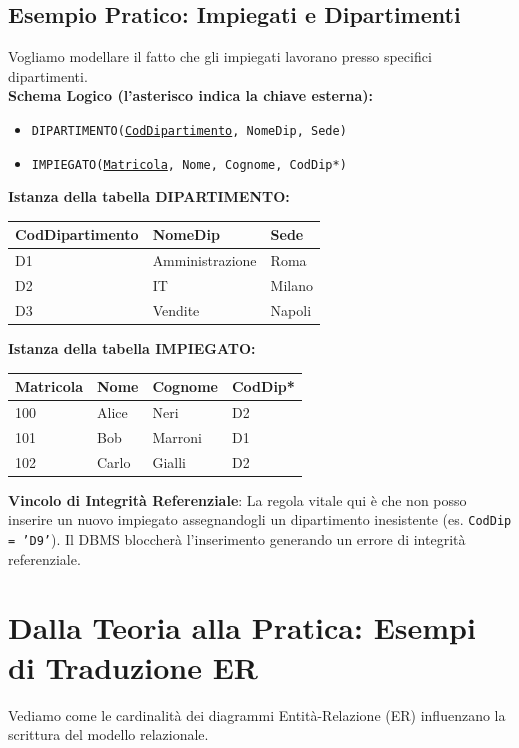 \subsection*{Esempio Pratico: Impiegati e Dipartimenti}
Vogliamo modellare il fatto che gli impiegati lavorano presso specifici dipartimenti.
\\[0.2cm]
\textbf{Schema Logico (l'asterisco indica la chiave esterna):}
\begin{itemize}
    \item \texttt{DIPARTIMENTO(\underline{CodDipartimento}, NomeDip, Sede)}
    \item \texttt{IMPIEGATO(\underline{Matricola}, Nome, Cognome, CodDip*)} 
\end{itemize}

\vspace{0.2cm}
\textbf{Istanza della tabella DIPARTIMENTO:}
\begin{center}
\renewcommand{\arraystretch}{1.2}
\begin{tabular}{|l|l|l|}
\hline
\textbf{CodDipartimento} & \textbf{NomeDip} & \textbf{Sede} \\
\hline
D1 & Amministrazione & Roma \\
D2 & IT & Milano \\
D3 & Vendite & Napoli \\
\hline
\end{tabular}
\end{center}

\textbf{Istanza della tabella IMPIEGATO:}
\begin{center}
\renewcommand{\arraystretch}{1.2}
\begin{tabular}{|l|l|l|l|}
\hline
\textbf{Matricola} & \textbf{Nome} & \textbf{Cognome} & \textbf{CodDip*} \\
\hline
100 & Alice & Neri & D2 \\
101 & Bob & Marroni & D1 \\
102 & Carlo & Gialli & D2 \\
\hline
\end{tabular}
\end{center}

\textbf{Vincolo di Integrità Referenziale}: La regola vitale qui è che non posso inserire un nuovo impiegato assegnandogli un dipartimento inesistente (es. \texttt{CodDip = 'D9'}). Il DBMS bloccherà l'inserimento generando un errore di integrità referenziale.

\section{Dalla Teoria alla Pratica: Esempi di Traduzione ER}
Vediamo come le cardinalità dei diagrammi Entità-Relazione (ER) influenzano la scrittura del modello relazionale.


